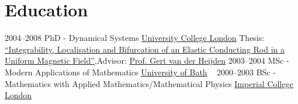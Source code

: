 \documentclass[english, print]{cv-style-wide}
\begin{document}
\section{Education}
\vspace{-0.2cm}
\begin{entrylist}
\entry
{2004--2008}
{PhD \hspace{\diffpwidth/2}-\hspace{\diffpwidth/2} Dynamical Systems}
{%
\setul{0.5ex}{0.4pt}%
\href{https://ucl.ac.uk}{\ul{University College London}}
}%
{%
%
\setul{0.5ex}{0.4pt}%
Thesis: \hspace{\uclwidth}\href{https://www.google.com/url?sa=t&source=web&rct=j&opi=89978449&url=https://discovery.ucl.ac.uk/15832/1/15832.pdf}{\enquote{Integrability, Localisation and Bifurcation of an Elastic Conducting Rod in a Uniform Magnetic Field}},\newline{}Advisor: \href{https://profiles.ucl.ac.uk/12184-gert-van-der-heijden}{\ul{Prof. Gert van der Heijden}}%
}
\threeentry
{2003--2004}
{MSc - Modern Applications of Mathematics}
{%
%
\setul{0.5ex}{0.4pt}%
\href{https://bath.ac.uk}{\ul{University of Bath}}%
}%
{~}
\threeentry
{2000--2003}
{BSc \hspace{\diffbwidth/2}-\hspace{\diffbwidth/2} Mathematics with Applied Mathematics/Mathematical Physics}
{%
%
\setul{0.5ex}{0.4pt}%
\href{https://imperial.ac.uk}{\ul{Imperial College London}}%
}%
{}

\end{entrylist}



\end{document}
